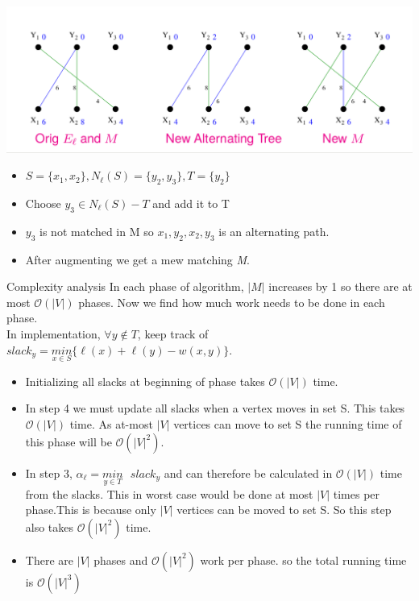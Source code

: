 \documentclass[11pt]{beamer}
\theoremstyle{definition}
\begin{document}
\begin{frame}
\includegraphics[scale=0.3]{hstep3}\cite{hungarian}
\begin{multicols}{2}
\begin{itemize}
\item $S = \{x_1 , x_2 \}, N_\ell (S) = \{y_2 , y_3 \}, T = \{y_2 \}$
\item Choose $y_3 \in N_\ell (S) - T$ and add it to T
\end{itemize}
\end{multicols}
\begin{itemize}
\item $y_3$ is not matched in M so
$x_1 , y_2 , x_2 , y_3$ is an alternating path.
\item After augmenting we get a mew matching \emph{M}.
\end{itemize}
\end{frame}


\begin{frame}{Complexity analysis}
In each phase of algorithm, $|M |$ increases by 1 so there are at most $\mathcal{O}(|V|)$ phases. Now we find how much work needs to be done in each phase.\\
In implementation, $\forall y \notin T$, keep track of $slack_y = \underset{x\in S}{min} \{\ell(x) + \ell(y) - w(x, y)\}.$\\
\begin{itemize}
\item Initializing all slacks at beginning of phase takes $\mathcal{O}(|V|)$ time.
\item In step 4 we must update all slacks when a vertex moves in set S. This takes  $\mathcal{O}(|V|)$ time. As at-most $|V|$ vertices can move to set S the running time of this phase will be $\mathcal{O}(|V|^2)$.
\end{itemize}
\end{frame}

\begin{frame}
\begin{itemize}

\item In step 3, $\alpha_\ell = \underset{y\in T}{min}\mbox{ } slack_y$ and can therefore be calculated in $\mathcal{O}(|V|)$ time from the slacks. This in worst case would be done at most $|V |$ times per phase.This is because only $|V|$ vertices can be moved to set S. So this step also takes $\mathcal{O}(|V|^2)$ time.
\item There are $|V |$ phases and $\mathcal{O}(|V |^2 )$ work per phase. so the total running time is $\mathcal{O}(|V |^3 )$
\end{itemize}
\end{frame}
\end{document}
